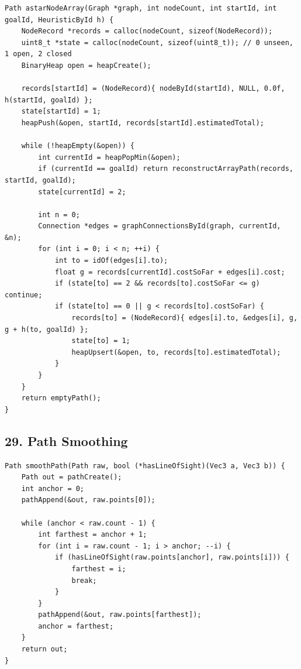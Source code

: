 \documentclass[10pt,letterpaper]{article}
\begin{document}
\begin{verbatim}
Path astarNodeArray(Graph *graph, int nodeCount, int startId, int goalId, HeuristicById h) {
    NodeRecord *records = calloc(nodeCount, sizeof(NodeRecord));
    uint8_t *state = calloc(nodeCount, sizeof(uint8_t)); // 0 unseen, 1 open, 2 closed
    BinaryHeap open = heapCreate();

    records[startId] = (NodeRecord){ nodeById(startId), NULL, 0.0f, h(startId, goalId) };
    state[startId] = 1;
    heapPush(&open, startId, records[startId].estimatedTotal);

    while (!heapEmpty(&open)) {
        int currentId = heapPopMin(&open);
        if (currentId == goalId) return reconstructArrayPath(records, startId, goalId);
        state[currentId] = 2;

        int n = 0;
        Connection *edges = graphConnectionsById(graph, currentId, &n);
        for (int i = 0; i < n; ++i) {
            int to = idOf(edges[i].to);
            float g = records[currentId].costSoFar + edges[i].cost;
            if (state[to] == 2 && records[to].costSoFar <= g) continue;
            if (state[to] == 0 || g < records[to].costSoFar) {
                records[to] = (NodeRecord){ edges[i].to, &edges[i], g, g + h(to, goalId) };
                state[to] = 1;
                heapUpsert(&open, to, records[to].estimatedTotal);
            }
        }
    }
    return emptyPath();
}
\end{verbatim}

\subsection*{29. Path Smoothing}
{}

\begin{verbatim}
Path smoothPath(Path raw, bool (*hasLineOfSight)(Vec3 a, Vec3 b)) {
    Path out = pathCreate();
    int anchor = 0;
    pathAppend(&out, raw.points[0]);

    while (anchor < raw.count - 1) {
        int farthest = anchor + 1;
        for (int i = raw.count - 1; i > anchor; --i) {
            if (hasLineOfSight(raw.points[anchor], raw.points[i])) {
                farthest = i;
                break;
            }
        }
        pathAppend(&out, raw.points[farthest]);
        anchor = farthest;
    }
    return out;
}
\end{verbatim}
\end{document}
